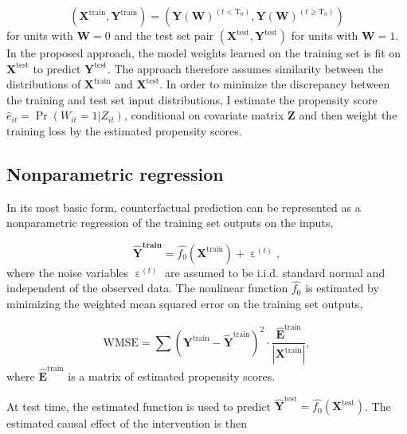 $$\left(\boldsymbol{X}^{\text{train}}, \boldsymbol{Y}^{\text{train}}\right) = \left(\boldsymbol{Y}(\boldsymbol{W})^{\left(t < \text{T}_0\right)}, \boldsymbol{Y}(\boldsymbol{W})^{\left(t \geq \text{T}_0\right)}\right)$$
\noindent
for units with $\boldsymbol{W}=0$ and the test set pair $\left(\boldsymbol{X}^{\text{test}}, \boldsymbol{Y}^{\text{test}}\right)$ for units with $\boldsymbol{W}=1$. In the proposed approach, the model weights learned on the training set is fit on $\boldsymbol{X}^{\text{test}}$ to predict $\boldsymbol{Y}^{\text{test}}$. The approach therefore assumes similarity between the distributions of $\boldsymbol{X}^{\text{train}}$ and $\boldsymbol{X}^{\text{test}}$. In order to minimize the discrepancy between the training and test set input distributions, I estimate the propensity score $\hat{e}_{it} = \Pr(W_{it}=1 | Z_{it})$, conditional on covariate matrix $\boldsymbol{Z}$ and then weight the training loss by the estimated propensity scores. 

\subsection{Nonparametric regression}

In its most basic form, counterfactual prediction can be represented as a nonparametric regression of the training set outputs on the inputs,

\begin{equation}\label{eq:np}
  \boldsymbol{\hat{\boldsymbol{Y}}^{\text{train}}} =  \hat{f_0} \left(\boldsymbol{X}^{\text{train}}\right) + \upepsilon^{(t)},
\end{equation}
\noindent
where the noise variables $\upepsilon^{(t)}$ are assumed to be i.i.d. standard normal and independent of the observed data. The nonlinear function $\hat{f_0}$ is estimated by minimizing the weighted mean squared error on the training set outputs, 

\begin{equation} \label{eq:mse}
\text{WMSE} = \sum \left(\boldsymbol{Y}^{\text{train}} - \boldsymbol{\hat{Y}}^{\text{train}}  \right)^2  \cdot \frac{\boldsymbol{\hat{E}}^\text{train}}{|\boldsymbol{X}^\text{train}|},
\end{equation}
\noindent
where $\boldsymbol{\hat{E}}^\text{train}$ is a matrix of estimated propensity scores. 

At test time, the estimated function is used to predict $\boldsymbol{\hat{Y}}^{\text{test}} = \hat{f_0} \left(\boldsymbol{X}^{\text{test}}\right)$. The estimated causal effect of the intervention is then


